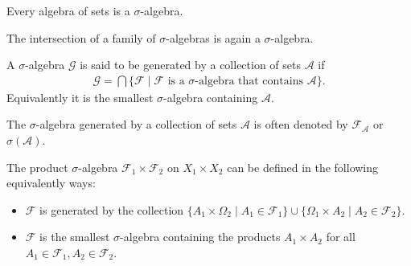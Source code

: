     \begin{result}
        Every algebra of sets is a $\sigma$-algebra.
    \end{result}

    \begin{property}[Intersections]
        The intersection of a family of $\sigma$-algebras is again a $\sigma$-algebra.
    \end{property}

    \begin{definition}
        A $\sigma$-algebra $\mathcal{G}$ is said to be generated by a collection of sets $\mathcal{A}$ if
        \begin{gather}
            \label{set:generated_sigma_algebra}
            \mathcal{G} = \bigcap\{\mathcal{F}\mid\mathcal{F}\text{ is a } \sigma\text{-algebra that contains }\mathcal{A}\}.
        \end{gather}
        Equivalently it is the smallest $\sigma$-algebra containing $\mathcal{A}$.
    \end{definition}
    \begin{notation}\label{set:notation:generated_sigma_algebra}
        The $\sigma$-algebra generated by a collection of sets $\mathcal{A}$ is often denoted by $\mathcal{F}_\mathcal{A}$ or $\sigma(\mathcal{A})$.
    \end{notation}

    \begin{definition}\label{set:product_of_sigma_algebras}
        The product $\sigma$-algebra $\mathcal{F}_1\times\mathcal{F}_2$ on $X_1\times X_2$ can be defined in the following equivalently ways:
        \begin{itemize}
            \item $\mathcal{F}$ is generated by the collection $\{A_1\times\Omega_2\mid A_1\in\mathcal{F}_1\}\cup\{\Omega_1\times A_2\mid A_2\in\mathcal{F}_2\}$.
            \item $\mathcal{F}$ is the smallest $\sigma$-algebra containing the products $A_1\times A_2$ for all $A_1\in\mathcal{F}_1, A_2\in\mathcal{F}_2$.
        \end{itemize}
    \end{definition}


